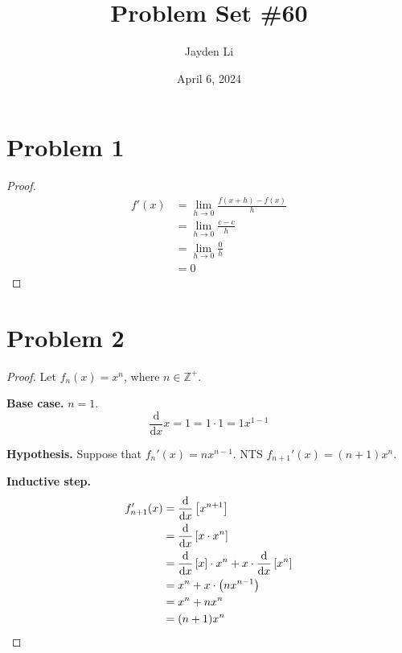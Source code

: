 \documentclass{article}
\title{Problem Set \#60}
\author{Jayden Li}
\date{April 6, 2024}
\newcommand*{\paren}[1]{\ensuremath\left(#1\right)}
\newcommand*{\problem}[1]{\section*{Problem #1}}
\newcommand*{\limit}[2][x]{\ensuremath{\displaystyle\lim_{#1\to#2}}}
\newcommand*{\deriv}[1][x]{\ensuremath{\dfrac{\mathrm{d}}{\mathrm{d}#1}}}
\newcommand*{\Deriv}[2][x]{\ensuremath{\dfrac{\mathrm{d}}{\mathrm{d}#1}\left[#2\right]}}
\begin{document}
\fontsize{12pt}{12pt}\selectfont
\setlength{\abovedisplayskip}{0pt}
\maketitle

\problem{1}
\begin{proof}
	\begin{align*}
		f'(x)&=\limit[h]{0}\frac{f(x+h)-f(x)}{h} \\
		&=\limit[h]{0}\frac{c-c}{h} \\
		&=\limit[h]{0}\frac{0}{h} \\
		&=0
	\end{align*}
\end{proof}

\problem{2}
\begin{proof}
	Let $f_n(x)=x^n$, where $n\in\mathbb{Z}^+$.

	\textbf{Base case.} $n=1$.
	\begin{equation*}
		\deriv x=1=1\cdot1=1x^{1-1}
	\end{equation*}

	\textbf{Hypothesis.} Suppose that $f_n'(x)=nx^{n-1}$. NTS $f_{n+1}'(x)=(n+1)x^n$.

	\textbf{Inductive step.}
	\begin{align*}
		f_{n+1}'(x)&=\Deriv{x^{n+1}} \\
		&=\Deriv{x\cdot x^n} \\
		&=\Deriv{x}\cdot x^n+x\cdot\Deriv{x^n} \\
		&=x^n+x\cdot\paren{nx^{n-1}} \\
		&=x^n+nx^n \\
		&=(n+1)x^n
	\end{align*}
\end{proof}
\end{document}
